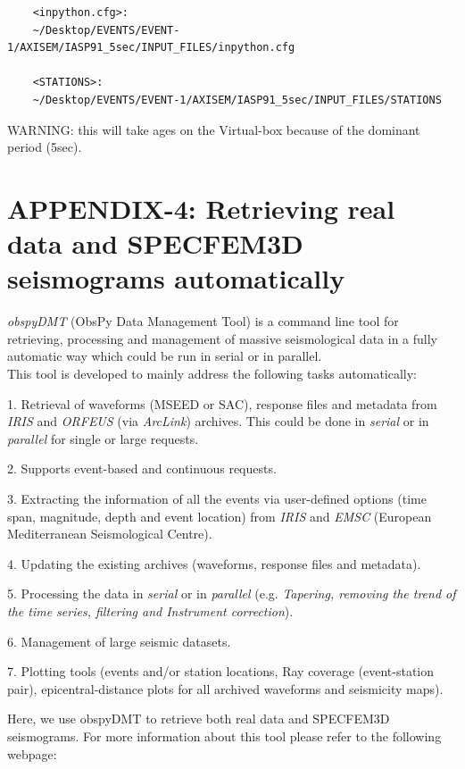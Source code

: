\documentclass{article}
\begin{document}
\begin{verbatim}
    <inpython.cfg>: 
    ~/Desktop/EVENTS/EVENT-1/AXISEM/IASP91_5sec/INPUT_FILES/inpython.cfg
    
    <STATIONS>:
    ~/Desktop/EVENTS/EVENT-1/AXISEM/IASP91_5sec/INPUT_FILES/STATIONS
\end{verbatim}

WARNING: this will take ages on the Virtual-box because of the dominant period (5sec).

\newpage
\section{APPENDIX-4: Retrieving real data and SPECFEM3D seismograms automatically}

{\color{color18} \emph{obspyDMT}} (ObsPy Data Management Tool) is a command line 
tool for retrieving, processing and management of massive seismological data in 
a fully automatic way which could be run in serial or in parallel. \\

This tool is developed to mainly address the following tasks automatically:

1. Retrieval of waveforms (MSEED or SAC), response files and metadata from {\color{color18} \emph{IRIS}} 
and {\color{color18} \emph{ORFEUS}} (via {\color{color18} \emph{ArcLink}}) archives. 
This could be done in \textit{serial} or in \textit{parallel} for single or large 
requests.

2. Supports event-based and continuous requests.

3. Extracting the information of all the events via user-defined options (time 
span, magnitude, depth and event location) from {\color{color18} \emph{IRIS}} and 
{\color{color18} \emph{EMSC}} (European Mediterranean Seismological Centre).

4. Updating the existing archives (waveforms, response files and metadata).

5. Processing the data in \textit{serial} or in \textit{parallel} (e.g. \textit{Tapering, 
removing the trend of the time series, filtering and Instrument correction}).

6. Management of large seismic datasets.

7. Plotting tools (events and/or station locations, Ray coverage (event-station 
pair), epicentral-distance plots for all archived waveforms and seismicity maps).

\vspace{13pt}
Here, we use obspyDMT to retrieve both real data and SPECFEM3D seismograms. For 
more information about this tool please refer to the following webpage:
\end{document}
